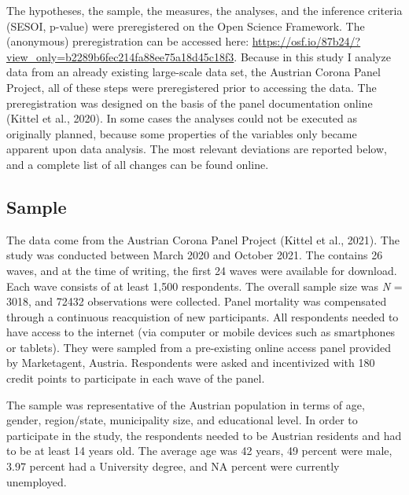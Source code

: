 \documentclass[
  english,
  man,mask,floatsintext]{apa6}
\begin{document}
The hypotheses, the sample, the measures, the analyses, and the inference criteria (SESOI, p-value) were preregistered on the Open Science Framework.
The (anonymous) preregistration can be accessed here: \url{https://osf.io/87b24/?view_only=b2289b6fec214fa88ee75a18d45c18f3}.
Because in this study I analyze data from an already existing large-scale data set, the Austrian Corona Panel Project, all of these steps were preregistered prior to accessing the data.
The preregistration was designed on the basis of the panel documentation online (Kittel et al., 2020).
In some cases the analyses could not be executed as originally planned, because some properties of the variables only became apparent upon data analysis.
The most relevant deviations are reported below, and a complete list of all changes can be found online.

\hypertarget{sample}{%
\subsection{Sample}\label{sample}}

The data come from the Austrian Corona Panel Project (Kittel et al., 2021).
The study was conducted between March 2020 and October 2021.
The contains 26 waves, and at the time of writing, the first 24 waves were available for download.
Each wave consists of at least 1,500 respondents.
The overall sample size was \emph{N} = 3018, and 72432 observations were collected.
Panel mortality was compensated through a continuous reacquistion of new participants.
All respondents needed to have access to the internet (via computer or mobile devices such as smartphones or tablets).
They were sampled from a pre-existing online access panel provided by Marketagent, Austria.
Respondents were asked and incentivized with 180 credit points to participate in each wave of the panel.

The sample was representative of the Austrian population in terms of age, gender, region/state, municipality size, and educational level. In order to participate in the study, the respondents needed to be Austrian residents and had to be at least 14 years old.
The average age was 42 years, 49 percent were male, 3.97 percent had a University degree, and NA percent were currently unemployed.
\end{document}
